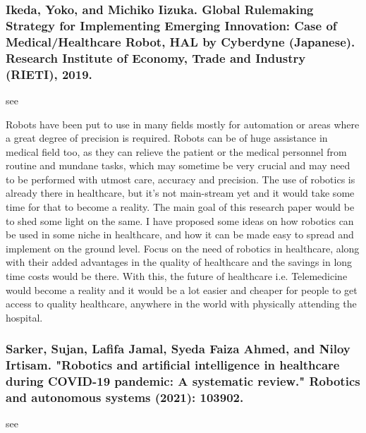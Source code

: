 \documentclass[conference]{IEEEtran}
\begin{document}
\medskip
\subsubsection{Ikeda, Yoko, and Michiko Iizuka. Global Rulemaking Strategy for Implementing Emerging Innovation: Case of Medical/Healthcare Robot, HAL by Cyberdyne (Japanese). Research Institute of Economy, Trade and Industry (RIETI), 2019.}
see \cite{ikeda2019global}

Robots have been put to use in many fields mostly for automation or areas where a great degree of precision is required. Robots can be of huge assistance in medical field too, as they can relieve the patient or the medical personnel from routine and mundane tasks, which may sometime be very crucial and may need to be performed with utmost care, accuracy and precision. The use of robotics is already there in healthcare, but it's not main-stream yet and it would take some time for that to become a reality. The main goal of this research paper would be to shed some light on the same. I have proposed some ideas on how robotics can be used in some niche in healthcare, and how it can be made easy to spread and implement on the ground level. Focus on the need of robotics in healthcare, along with their added advantages in the quality of healthcare and the savings in long time costs would be there. With this, the future of healthcare i.e. Telemedicine would become a reality and it would be a lot easier and cheaper for people to get access to quality healthcare, anywhere in the world with physically attending the hospital.

\medskip
\subsubsection{Sarker, Sujan, Lafifa Jamal, Syeda Faiza Ahmed, and Niloy Irtisam. "Robotics and artificial intelligence in healthcare during COVID-19 pandemic: A systematic review." Robotics and autonomous systems (2021): 103902.}
see \cite{sarker2021robotics}
\end{document}
